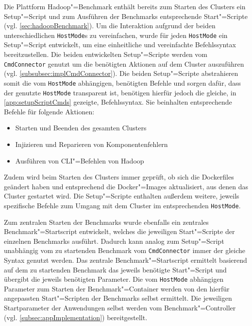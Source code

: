 Die Plattform Hadoop"=Benchmark enthält bereits zum Starten des Clusters ein Setup"=Script und zum Ausführen der Benchmarks entsprechende Start"=Scripte (vgl. \cref{sec:hadoopBenchmark}).
Um die Interaktion aufgrund der beiden unterschiedlichen \texttt{HostMode}s zu vereinfachen, wurde für jeden \texttt{HostMode} ein Setup"=Script entwickelt, um eine einheitliche und vereinfachte Befehlssyntax bereitzustellen.
Die beiden entwickelten Setup"=Scripte werden vom \texttt{CmdConnector} genutzt um die benötigten Aktionen auf dem Cluster auszuführen (vgl. \cref{subsubsec:implCmdConnector}).
Die beiden Setup"=Scripte abstrahieren somit die vom \texttt{HostMode} abhängigen, benötigten Befehle und sorgen dafür, dass der genutzte \texttt{HostMode} transparent ist, benötigen hierfür jedoch die gleiche, in \cref{app:setupScriptCmds} gezeigte, Befehlssyntax.
Sie beinhalten entsprechende Befehle für folgende Aktionen:

\begin{itemize}
    \item Starten und Beenden des gesamten Clusters
    \item Injizieren und Reparieren von Komponentenfehlern
    \item Ausführen von \gls{CLI}"=Befehlen von Hadoop
\end{itemize}

Zudem wird beim Starten des Clusters immer geprüft, ob sich die Dockerfiles geändert haben und entsprechend die Docker"=Images aktualisiert, aus denen das Cluster gestartet wird.
Die Setup"=Scripte enthalten außerdem weitere, jeweils spezifische Befehle zum Umgang mit dem Cluster im entsprechenden \texttt{HostMode}.

Zum zentralen Starten der Benchmarks wurde ebenfalls ein zentrales Benchmark"=Startscript entwickelt, welches die jeweiligen Start"=Scripte der einzelnen Benchmarks ausführt.
Dadurch kann analog zum Setup"=Script unabhängig vom zu startenden Benchmark vom \texttt{CmdConnector} immer der gleiche Syntax genutzt werden.
Das zentrale Benchmark"=Startscript ermittelt basierend auf dem zu startenden Benchmark das jeweils benötigte Start"=Script und übergibt die jeweils benötigten Parameter.
Die vom \texttt{HostMode} abhängigen Parameter zum Starten der Benchmark"=Container werden von den hierfür angepassten Start"=Scripten der Benchmarks selbst ermittelt.
Die jeweiligen Startparameter der Anwendungen selbst werden vom Benchmark"=Controller (vgl. \cref{subsec:appImplementation}) bereitgestellt.
